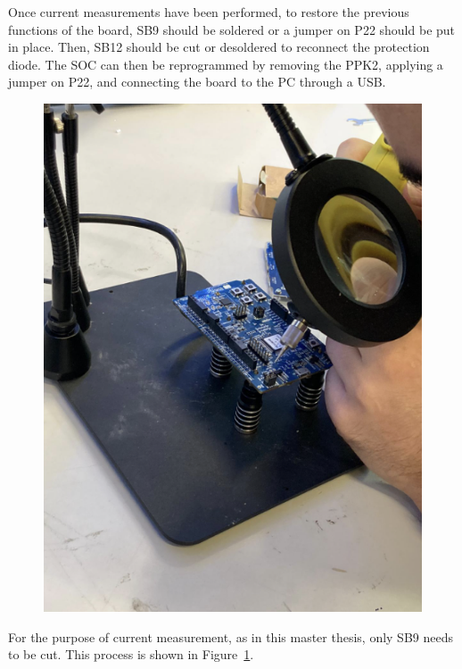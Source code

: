 \documentclass{Configuration_Files/PoliMi3i_thesis}
\begin{document}
Once current measurements have been performed, to restore the previous functions of the board, SB9 should be soldered or a jumper on P22 should be put in place. Then, SB12 should be cut or desoldered to reconnect the protection diode. The SOC can then be reprogrammed by removing the PPK2, applying a jumper on P22, and connecting the board to the PC through a USB.

\begin{figure}[h]
    \centering
    \includegraphics[scale=0.3]{Test_Procedure/17.png}
    \label{fig:cutting_process_SB9}
\end{figure}

For the purpose of current measurement, as in this master thesis, only SB9 needs to be cut. This process is shown in Figure~\ref{fig:cutting_process_SB9}.
\end{document}
